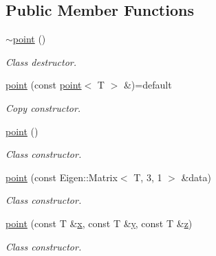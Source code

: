 \subsection*{Public Member Functions}
\begin{DoxyCompactItemize}
\item 
\mbox{\label{classddd_1_1point_ab946d459bb160ea06b49c10c3d0dac65}} 
\hyperlink{classddd_1_1point_ab946d459bb160ea06b49c10c3d0dac65}{$\sim$point} ()
\begin{DoxyCompactList}\small\item\em Class destructor. \end{DoxyCompactList}\item 
\mbox{\label{classddd_1_1point_a09fb0691923b2dad58f9e5e2eb89bc9c}} 
\hyperlink{classddd_1_1point_a09fb0691923b2dad58f9e5e2eb89bc9c}{point} (const \hyperlink{classddd_1_1point}{point}$<$ T $>$ \&)=default
\begin{DoxyCompactList}\small\item\em Copy constructor. \end{DoxyCompactList}\item 
\mbox{\label{classddd_1_1point_a38a912e04a5429e7416bea414482a5a5}} 
\hyperlink{classddd_1_1point_a38a912e04a5429e7416bea414482a5a5}{point} ()
\begin{DoxyCompactList}\small\item\em Class constructor. \end{DoxyCompactList}\item 
\hyperlink{classddd_1_1point_a0146118d518509e9e7cdf4fb6733eb48}{point} (const Eigen\+::\+Matrix$<$ T, 3, 1 $>$ \&data)
\begin{DoxyCompactList}\small\item\em Class constructor. \end{DoxyCompactList}\item 
\hyperlink{classddd_1_1point_a1f05ca364672341087e1a22b2298d649}{point} (const T \&\hyperlink{classddd_1_1point_af165c07ef348f3d795469b8b0918a3ba}{x}, const T \&\hyperlink{classddd_1_1point_a632f731dfcc4cc1693948d861cb7327d}{y}, const T \&\hyperlink{classddd_1_1point_aeb266a3811a70700ee7d52cacfdc0b9f}{z})
\begin{DoxyCompactList}\small\item\em Class constructor. \end{DoxyCompactList}\item 

\end{DoxyCompactItemize}
